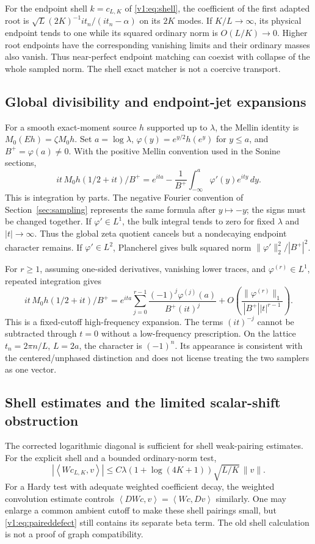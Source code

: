 \documentclass[11pt]{article}
\theoremstyle{remark}
\newcommand{\ip}[2]{\left\langle #1,#2\right\rangle}
\begin{document}
For the endpoint shell $k=c_{L,K}$ of \eqref{v1:eq:shell}, the
coefficient of the first adapted root is
$\sqrt L(2K)^{-1}it_n/(it_n-\alpha)$ on its $2K$ modes.
If $K/L\to\infty$, its physical endpoint tends to one while its squared
ordinary norm is $O(L/K)\to0$. Higher root endpoints have the corresponding
vanishing limits and their ordinary masses also vanish. Thus near-perfect
endpoint matching can coexist with collapse of the whole sampled norm.
The shell exact matcher is not a coercive transport.

\subsection*{Global divisibility and endpoint-jet expansions}
For a smooth exact-moment source $h$ supported up to $\lambda$, the
Mellin identity is $M_0(Eh)=\zeta M_0h$. Set
$a=\log\lambda$, $\varphi(y)=e^{y/2}h(e^y)$ for $y\le a$, and
$B^+=\varphi(a)\ne0$. With the positive Mellin convention used in
the Sonine sections,
\[
 it\,M_0h(1/2+it)/B^+
 =e^{ita}-\frac1{B^+}\int_{-\infty}^a\varphi'(y)e^{ity}\,dy.
\]
This is integration by parts. The negative Fourier convention of
Section~\ref{sec:sampling} represents the same formula after $y\mapsto-y$;
the signs must be changed together. If $\varphi'\in L^1$, the bulk
integral tends to zero for fixed $\lambda$ and $|t|\to\infty$.
Thus the global zeta quotient cancels but a nondecaying endpoint character
remains. If $\varphi'\in L^2$, Plancherel gives bulk squared norm
$\|\varphi'\|_2^2/|B^+|^2$.

For $r\ge1$, assuming one-sided derivatives, vanishing lower traces,
and $\varphi^{(r)}\in L^1$, repeated integration gives
\[
 it\,M_0h(1/2+it)/B^+
 =e^{ita}\sum_{j=0}^{r-1}
   \frac{(-1)^j\varphi^{(j)}(a)}{B^+(it)^j}
   +O\!\left(\frac{\|\varphi^{(r)}\|_1}
                       {|B^+||t|^{r-1}}\right).
\]
This is a fixed-cutoff high-frequency expansion. The terms $(it)^{-j}$
cannot be subtracted through $t=0$ without a low-frequency prescription.
On the lattice $t_n=2\pi n/L$, $L=2a$, the character is $(-1)^n$.
Its appearance is consistent with the centered/unphased distinction and
does not license treating the two samplers as one vector.

\subsection*{Shell estimates and the limited scalar-shift obstruction}
The corrected logarithmic diagonal is sufficient for shell weak-pairing
estimates. For the explicit shell and a bounded ordinary-norm test,
\[
 |\ip{Wc_{L,K}}{v}|
 \le C\lambda(1+\log(4K+1))\sqrt{L/K}\,\|v\|.
\]
For a Hardy test with adequate weighted coefficient decay, the weighted
convolution estimate controls $\ip{DWc}{v}=\ip{Wc}{Dv}$ similarly.
One may enlarge a common ambient cutoff to make these shell pairings
small, but \eqref{v1:eq:paireddefect} still contains its separate beta
term. The old shell calculation is not a proof of graph compatibility.
\end{document}
